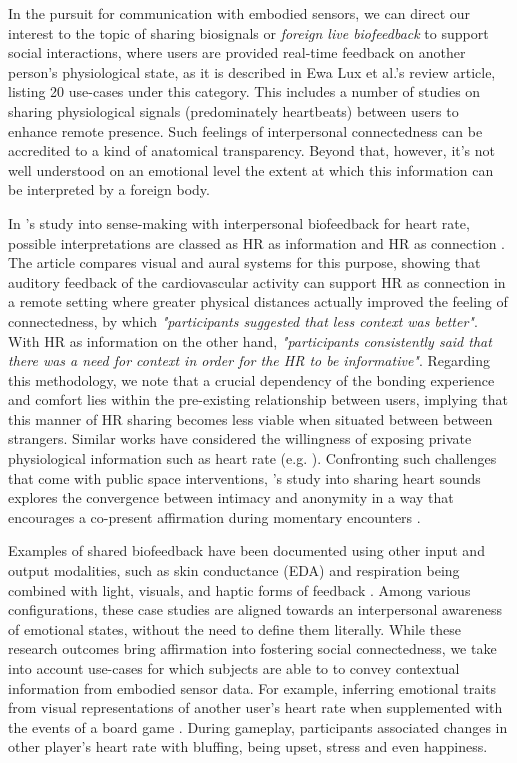 In the pursuit for communication with embodied sensors, we can direct our interest to the topic of sharing biosignals or \textit{foreign live biofeedback} to support social interactions, where users are provided real-time feedback on another person's physiological state, as it is described in Ewa Lux et al.'s \cite{lux_live_2018} review article, listing 20 use-cases under this category. This includes a number of studies on sharing physiological signals (predominately heartbeats) between users to enhance remote presence. Such feelings of interpersonal connectedness can be accredited to a kind of anatomical transparency. Beyond that, however, it's not well understood on an emotional level the extent at which this information can be interpreted by a foreign body.

In \citeauthor{slovak_understanding_2012}'s study into sense-making with interpersonal biofeedback for heart rate, possible interpretations are classed as HR as information and HR as connection \cite{slovak_understanding_2012}. The article compares visual and aural systems for this purpose, showing that auditory feedback of the cardiovascular activity can support HR as connection in a remote setting where greater physical distances actually improved the feeling of connectedness, by which \textit{"participants suggested that less context was better"}. With HR as information on the other hand, \textit{"participants consistently said that there was a need for context in order for the HR to be informative"}. Regarding this methodology, we note that a crucial dependency of the bonding experience and comfort lies within the pre-existing relationship between users, implying that this manner of HR sharing becomes less viable when situated between between strangers. Similar works have considered the willingness of exposing private physiological information such as heart rate (e.g. \cite{walmink_displaying_2013}). Confronting such challenges that come with public space interventions, \citeauthor{howell_life-affirming_2019}'s study into sharing heart sounds explores the convergence between intimacy and anonymity in a way that encourages a co-present affirmation during momentary encounters \cite{howell_life-affirming_2019}. 

Examples of shared biofeedback have been documented using other input and output modalities, such as skin conductance (EDA) and respiration being combined with light, visuals, and haptic forms of feedback \cite{frey_breeze_2018,howell_biosignals_2016,ashford_eeg_2019}. Among various configurations, these case studies are aligned towards an interpersonal awareness of emotional states, without the need to define them literally. While these research outcomes bring affirmation into fostering social connectedness, we take into account use-cases for which subjects are able to to convey contextual information from embodied sensor data. For example, inferring emotional traits from visual representations of another user's heart rate when supplemented with the events of a board game \cite{frey_remote_2016}. During gameplay, participants associated changes in other player's heart rate with bluffing, being upset, stress and even happiness. 

